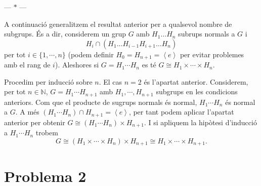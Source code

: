 \documentclass[12pt]{article}
\newcommand{\gen}[1]{\left\langle #1 \right\rangle}
\newcommand{\parbreak}{
	\begin{center}
		--- $\ast$ ---
	\end{center} 
}
\begin{document}
\parbreak

A continuació generalitzem el resultat anterior per a qualsevol nombre de subgrups. És a dir, considerem un grup \( G \) amb \( H_1 \dots H_n \) subrups normals a \( G \) i 
\begin{equation*}
	H_i \cap \left(H_1 \dots H_{i-1} H_{i+1} \dots H_n\right) 
\end{equation*}
per tot \( i \in \{1, \cdots, n\} \) (podem definir \( H_0 = H_{n+1} = \gen{e} \) per evitar problemes amb el rang de \( i \)). Aleshores si \( G = H_1\cdots H_n \) es té \( G \cong H_1 \times \cdots \times H_n \).

Procedim per inducció sobre \( n \). El cas \( n = 2 \) és l'apartat anterior. Considerem, per tot \( n \in \mathbb{N} \), \( G = H_1 \cdots H_{n+1} \) amb \( H_1, \cdots , H_{n+1} \) subgrups en les condicions anteriors. Com que el producte de sugrups normals és normal, \( H_1\cdots H_n \) és normal a \( G \). A més \( \left(H_1 \cdots H_n \right) \cap H_{n+1} = \gen{e} \), per tant podem aplicar l'apartat anterior per obtenir \( G \cong \left(H_1 \cdots H_n\right) \times H_{n+1} \). I si apliquem la hipòtesi d'inducció a \( H_1 \cdots H_n \) trobem 
\begin{equation*}
	G \cong \left(H_1 \times \cdots \times H_n\right) \times H_{n+1} \cong H_1 \times \cdots \times H_{n+1}.
\end{equation*}

\pagebreak
\section*{Problema 2}
\end{document}
